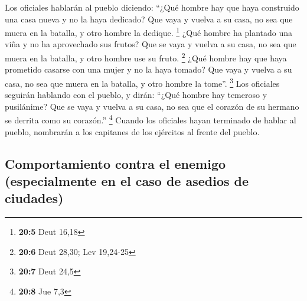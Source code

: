\begin{paracol}{2}
 Los oficiales hablarán al pueblo diciendo: ``¿Qué hombre
hay que haya construido una casa nueva y no la haya dedicado? Que vaya y
vuelva a su casa, no sea que muera en la batalla, y otro hombre la
dedique. \footnote{\textbf{20:5} Deut 16,18}  ¿Qué hombre
ha plantado una viña y no ha aprovechado sus frutos? Que se vaya y
vuelva a su casa, no sea que muera en la batalla, y otro hombre use su
fruto. \footnote{\textbf{20:6} Deut 28,30; Lev 19,24-25} 
¿Qué hombre hay que haya prometido casarse con una mujer y no la haya
tomado? Que vaya y vuelva a su casa, no sea que muera en la batalla, y
otro hombre la tome''. \footnote{\textbf{20:7} Deut 24,5} 
Los oficiales seguirán hablando con el pueblo, y dirán: ``¿Qué hombre
hay temeroso y pusilánime? Que se vaya y vuelva a su casa, no sea que el
corazón de su hermano se derrita como su corazón.'' \footnote{\textbf{20:8}
  Jue 7,3}  Cuando los oficiales hayan terminado de hablar
al pueblo, nombrarán a los capitanes de los ejércitos al frente del
pueblo.

\hypertarget{comportamiento-contra-el-enemigo-especialmente-en-el-caso-de-asedios-de-ciudades}{%
\subsection{Comportamiento contra el enemigo (especialmente en el caso
de asedios de
ciudades)}\label{comportamiento-contra-el-enemigo-especialmente-en-el-caso-de-asedios-de-ciudades}}


\end{paracol}
